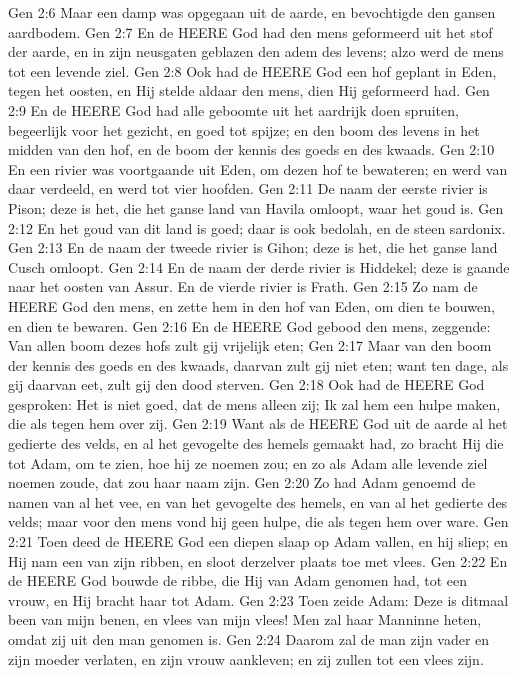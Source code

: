 Gen 2:6  Maar een damp was opgegaan uit de aarde, en bevochtigde den gansen aardbodem.
Gen 2:7  En de HEERE God had den mens geformeerd uit het stof der aarde, en in zijn neusgaten geblazen den adem des levens; alzo werd de mens tot een levende ziel.
Gen 2:8  Ook had de HEERE God een hof geplant in Eden, tegen het oosten, en Hij stelde aldaar den mens, dien Hij geformeerd had.
Gen 2:9  En de HEERE God had alle geboomte uit het aardrijk doen spruiten, begeerlijk voor het gezicht, en goed tot spijze; en den boom des levens in het midden van den hof, en de boom der kennis des goeds en des kwaads.
Gen 2:10  En een rivier was voortgaande uit Eden, om dezen hof te bewateren; en werd van daar verdeeld, en werd tot vier hoofden.
Gen 2:11  De naam der eerste rivier is Pison; deze is het, die het ganse land van Havila omloopt, waar het goud is.
Gen 2:12  En het goud van dit land is goed; daar is ook bedolah, en de steen sardonix.
Gen 2:13  En de naam der tweede rivier is Gihon; deze is het, die het ganse land Cusch omloopt.
Gen 2:14  En de naam der derde rivier is Hiddekel; deze is gaande naar het oosten van Assur. En de vierde rivier is Frath.
Gen 2:15  Zo nam de HEERE God den mens, en zette hem in den hof van Eden, om dien te bouwen, en dien te bewaren.
Gen 2:16  En de HEERE God gebood den mens, zeggende: Van allen boom dezes hofs zult gij vrijelijk eten;
Gen 2:17  Maar van den boom der kennis des goeds en des kwaads, daarvan zult gij niet eten; want ten dage, als gij daarvan eet, zult gij den dood sterven.
Gen 2:18  Ook had de HEERE God gesproken: Het is niet goed, dat de mens alleen zij; Ik zal hem een hulpe maken, die als tegen hem over zij.
Gen 2:19  Want als de HEERE God uit de aarde al het gedierte des velds, en al het gevogelte des hemels gemaakt had, zo bracht Hij die tot Adam, om te zien, hoe hij ze noemen zou; en zo als Adam alle levende ziel noemen zoude, dat zou haar naam zijn.
Gen 2:20  Zo had Adam genoemd de namen van al het vee, en van het gevogelte des hemels, en van al het gedierte des velds; maar voor den mens vond hij geen hulpe, die als tegen hem over ware.
Gen 2:21  Toen deed de HEERE God een diepen slaap op Adam vallen, en hij sliep; en Hij nam een van zijn ribben, en sloot derzelver plaats toe met vlees.
Gen 2:22  En de HEERE God bouwde de ribbe, die Hij van Adam genomen had, tot een vrouw, en Hij bracht haar tot Adam.
Gen 2:23  Toen zeide Adam: Deze is ditmaal been van mijn benen, en vlees van mijn vlees! Men zal haar Manninne heten, omdat zij uit den man genomen is.
Gen 2:24  Daarom zal de man zijn vader en zijn moeder verlaten, en zijn vrouw aankleven; en zij zullen tot een vlees zijn.
